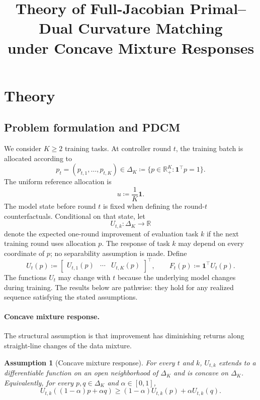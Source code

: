 \documentclass[11pt]{article}
\title{Theory of Full-Jacobian Primal--Dual Curvature Matching\\under Concave Mixture Responses}
\author{}
\date{}
\newtheorem{assumption}{Assumption}
\newcommand{\R}{\mathbb{R}}
\newcommand{\DeltaK}{\Delta_K}
\newcommand{\one}{\mathbf{1}}
\begin{document}
\maketitle
\vspace{-1.5em}

\section{Theory}

\subsection{Problem formulation and PDCM}

We consider $K\ge2$ training tasks. At controller round $t$, the training batch is allocated according to
\[
    p_t=(p_{t,1},\ldots,p_{t,K})\in
    \DeltaK
    \coloneqq
    \{p\in\R_+^K:\one^\top p=1\}.
\]
The uniform reference allocation is
\[
    u\coloneqq \frac1K\one.
\]
The model state before round $t$ is fixed when defining the round-$t$ counterfactuals. Conditional on that state, let
\[
    U_{t,k}:\DeltaK\to\R
\]
denote the expected one-round improvement of evaluation task $k$ if the next training round uses allocation $p$. The response of task $k$ may depend on every coordinate of $p$; no separability assumption is made. Define
\begin{equation}
    U_t(p)
    \coloneqq
    \begin{bmatrix}
        U_{t,1}(p)&\cdots&U_{t,K}(p)
    \end{bmatrix}^{\!\top},
    \qquad
    F_t(p)\coloneqq \one^\top U_t(p).
    \label{eq:def-U-F}
\end{equation}
The functions $U_t$ may change with $t$ because the underlying model changes during training. The results below are pathwise: they hold for any realized sequence satisfying the stated assumptions.

\paragraph{Concave mixture response.}
The structural assumption is that improvement has diminishing returns along straight-line changes of the data mixture.

\begin{assumption}[Concave mixture response]
\label{ass:concave}
For every $t$ and $k$, $U_{t,k}$ extends to a differentiable function on an open neighborhood of $\DeltaK$ and is concave on $\DeltaK$. Equivalently, for every $p,q\in\DeltaK$ and $\alpha\in[0,1]$,
\begin{equation}
    U_{t,k}((1-\alpha)p+\alpha q)
    \ge
    (1-\alpha)U_{t,k}(p)+\alpha U_{t,k}(q).
    \label{eq:line-concavity}
\end{equation}
\end{assumption}
\end{document}
